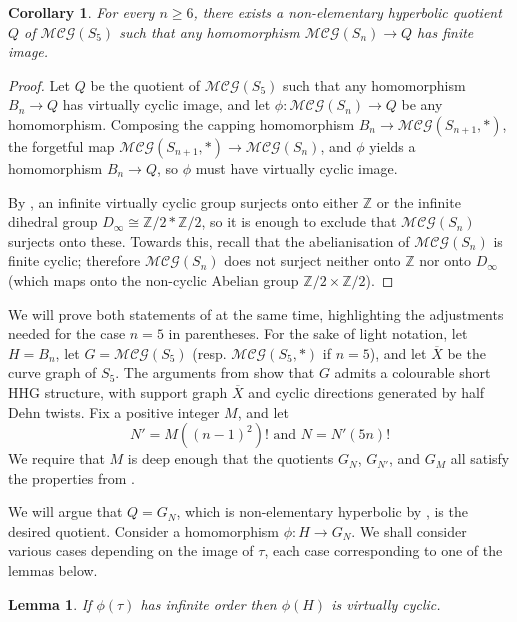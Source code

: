 \documentclass[svgnames]{amsart}
\theoremstyle{plain}
\newtheorem{lem}[thm]{Lemma}
\newtheorem{cor}[thm]{Corollary}
\theoremstyle{definition}
\newcommand{\Z}{\mathbb{Z}}
\newcommand{\MCG}{\mathcal{MCG}}
\newcommand{\ov}[1]{\overline{#1}}
\begin{document}
\begin{cor}\label{cor:uber_for_spheres}
    For every $n\ge 6$, there exists a non-elementary hyperbolic quotient $Q$ of $\MCG(S_5)$ such that any homomorphism $\MCG(S_n)\to Q$ has finite image.
\end{cor}
\begin{proof}
Let $Q$ be the quotient of $\MCG(S_5)$ such that any homomorphism $B_n\to Q$ has virtually cyclic image, and let $\phi\colon \MCG(S_n)\to Q$ be any homomorphism. Composing the capping homomorphism $B_n\to \MCG(S_{n+1},*)$, the forgetful map $\MCG(S_{n+1},*)\to \MCG(S_n)$, and $\phi$ yields a homomorphism $B_n\to Q$, so $\phi$ must have virtually cyclic image. 

By \cite[Lemma 3.2]{Macpherson_virtcyclic}, an infinite virtually cyclic group surjects onto either $\Z$ or the infinite dihedral group $D_\infty\cong \Z/2*\Z/2$, so it is enough to exclude that $\MCG(S_n)$ surjects onto these. Towards this, recall that the abelianisation of $\MCG(S_n)$ is finite cyclic; therefore $\MCG(S_n)$ does not surject neither onto $\Z$ nor onto $D_\infty$ (which maps onto the non-cyclic Abelian group $\Z/2\times \Z/2$).
\end{proof}


\noindent We will prove both statements of  at the same time, highlighting the adjustments needed for the case $n=5$ in parentheses. For the sake of light notation, let $H=B_n$, let $G=\MCG(S_5)$ (resp. $\MCG(S_5,*)$ if $n=5$), and let $\ov X$ be the curve graph of $S_5$. The arguments from \cite[Section 2.3.1]{short_HHG:I} show that $G$ admits a colourable short HHG structure, with support graph $\ov X$ and cyclic directions generated by half Dehn twists. Fix a positive integer $M$, and let 
\begin{equation}\label{eq:def_of_N_and_N'}
    N'=M((n-1)^2)!\mbox{ and }N=N'(5n)!
\end{equation}
We require that $M$ is deep enough that the quotients $G_N$, $G_{N'}$, and $G_M$ all satisfy the properties from .

We will argue that $Q=G_N$, which is non-elementary hyperbolic by , is the desired quotient. Consider a homomorphism $\phi\colon H\to G_N$. We shall consider various cases depending on the image of $\tau$, each case corresponding to one of the lemmas below.

    \begin{lem}\label{claim:finite_order_hdt}
        If $\phi(\tau)$ has infinite order then $\phi(H)$ is virtually cyclic.
    \end{lem}
\end{document}
